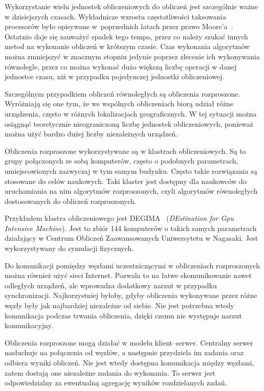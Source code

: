 \documentclass[a4paper,11pt,twoside]{report}
\theoremstyle{definition}
\begin{document}
    Wykorzystanie wielu jednostek obliczeniowych do obliczeń jest szczególnie ważne w dzisiejszych czasach.
    Wykładnicze wzrostu częstotliwości taksowania procesorów było
    opisywane w~poprzednich latach przez prawo Moore'a~\cite{prawo-moorea}.
    Ostatnio daje się zauważyć spadek tego tempa, przez co należy szukać innych metod na wykonanie obliczeń w krótszym czasie.
    Czas wykonania algorytmów można zmniejszyć w znacznym stopniu jedynie poprzez zlecenie ich wykonywania równolegle,
    przez co można wykonać dużo większą liczbę operacji w danej jednostce czasu,
    niż w przypadku pojedynczej jednostki obliczeniowej.

    Szczególnym przypadkiem obliczeń równoległych są obliczenia rozproszone.
    Wyróżniają się one tym, że we wspólnych obliczeniach biorą udział różne urządzenia, często w różnych lokalizacjach geograficznych.
    W tej sytuacji można osiągnąć teoretycznie nieograniczoną liczbę jednostek obliczeniowych,
    ponieważ można użyć bardzo dużej liczby niezależnych urządzeń.
    
    Obliczenia rozproszone wykorzystywane są w klastrach obliczeniowych.
    Są to grupy połączonych ze sobą komputerów, często o podobnych parametrach, umiejscowionych zazwyczaj w tym samym budynku.
    Często takie rozwiązania są stosowane do celów naukowych.
    Taki klaster jest dostępny dla naukowców do uruchamiania na nim algorytmów rozproszonych, czyli algorytmów równoległych dostosowanych do obliczeń rozproszonych.
    
    Przykładem klastra obliczeniowego jest DEGIMA~\cite{DEGIMA} (\textit{DEstination for Gpu Intensive Machine}).
    Jest to zbiór 144 komputerów o takich samych parametrach działający w Centrum Obliczeń Zaawansowanych Uniwersytetu w Nagasaki.
    Jest wykorzystywany do symulacji fizycznych.
    
    Do komunikacji pomiędzy węzłami uczestniczącymi w obliczeniach rozproszonych można również użyć sieci Internet.
    Pozwala to na łatwe skomunikowanie nawet odległych urządzeń, ale wprowadza dodatkowy narzut w przypadku synchronizacji.
    Najkorzystniej byłoby, gdyby obliczenia wykonywane przez różne węzły były jak najbardziej niezależne od siebie.
    Nie jest potrzebna wtedy komunikacja podczas trwania obliczenia, dzięki czemu nie występuje narzut komunikacyjny.
    
    Obliczenia rozproszone mogą działać w modelu klient--serwer.
    Centralny serwer nasłuchuje na połączenia od węzłów, a następnie przydziela im zadania oraz odbiera wyniki obliczeń.
    Nie jest wtedy dostępna komunikacja między węzłami, zatem dostają one niezależne zadania do wykonania.
    To serwer jest odpowiedzialny za ewentualną agregację wyników rozdzielanych zadań.
    
\end{document}
